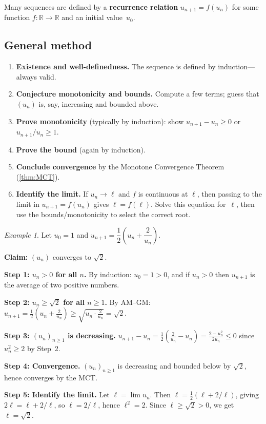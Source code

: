 \documentclass[12pt,a4paper,openany]{book}
\newcommand{\R}{\mathbb{R}}
\theoremstyle{definition}
\theoremstyle{remark}
\newtheorem{example}{Example}[chapter]
\begin{document}
Many sequences are defined by a \textbf{recurrence relation}
$u_{n+1} = f(u_n)$ for some function $f\colon \R \to \R$ and an initial value~$u_0$.

\subsection*{General method}
\begin{enumerate}
\item \textbf{Existence and well-definedness.} The sequence is defined by
      induction---always valid.
\item \textbf{Conjecture monotonicity and bounds.} Compute a few terms; guess
      that $(u_n)$ is, say, increasing and bounded above.
\item \textbf{Prove monotonicity} (typically by induction):
      show $u_{n+1} - u_n \geq 0$ or $u_{n+1}/u_n \geq 1$.
\item \textbf{Prove the bound} (again by induction).
\item \textbf{Conclude convergence} by the Monotone Convergence Theorem
      (\ref{thm:MCT}).
\item \textbf{Identify the limit.} If $u_n \to \ell$ and $f$ is continuous at
      $\ell$, then passing to the limit in $u_{n+1} = f(u_n)$ gives
      $\ell = f(\ell)$. Solve this equation for~$\ell$, then use the
      bounds/monotonicity to select the correct root.
\end{enumerate}

\begin{example}\label{ex:recursive-sqrt2}
Let $u_0 = 1$ and $u_{n+1} = \dfrac{1}{2}\!\left(u_n + \dfrac{2}{u_n}\right)$.

\textbf{Claim:} $(u_n)$ converges to $\sqrt{2}$.

\medskip\noindent
\textbf{Step 1: $u_n > 0$ for all $n$.}
By induction: $u_0 = 1 > 0$, and if $u_n > 0$ then $u_{n+1}$ is the average
of two positive numbers.

\textbf{Step 2: $u_n \geq \sqrt{2}$ for all $n \geq 1$.}
By AM--GM: $u_{n+1} = \frac{1}{2}(u_n + \frac{2}{u_n}) \geq
\sqrt{u_n \cdot \frac{2}{u_n}} = \sqrt{2}$.

\textbf{Step 3: $(u_n)_{n\geq 1}$ is decreasing.}
$u_{n+1} - u_n = \frac{1}{2}\!\left(\frac{2}{u_n} - u_n\right)
= \frac{2 - u_n^2}{2u_n} \leq 0$
since $u_n^2 \geq 2$ by Step~2.

\textbf{Step 4: Convergence.} $(u_n)_{n\geq 1}$ is decreasing and bounded
below by $\sqrt{2}$, hence converges by the MCT.

\textbf{Step 5: Identify the limit.} Let $\ell = \lim u_n$.
Then $\ell = \frac{1}{2}(\ell + 2/\ell)$, giving $2\ell = \ell + 2/\ell$,
so $\ell = 2/\ell$, hence $\ell^2 = 2$. Since $\ell \geq \sqrt{2} > 0$,
we get $\ell = \sqrt{2}$.
\end{example}
\end{document}

